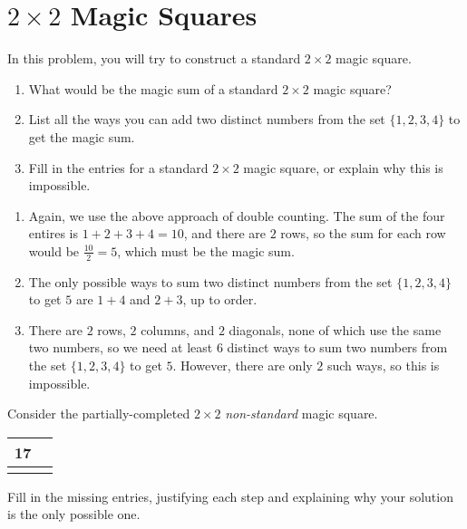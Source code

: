\documentclass[11pt]{article}
\renewenvironment{problem}{\begin{problems}}{\end{problems}\vspace{5pt}}
\begin{document}
\section{$2 \times 2$ Magic Squares}

\begin{problem}[6=2+2+2 points]
In this problem, you will try to construct a standard $2 \times 2$ magic square.
\begin{enumerate}[label=(\alph*)]
\item What would be the magic sum of a standard $2 \times 2$ magic square?

\item List all the ways you can add two distinct numbers from the set $\{1, 2, 3, 4\}$ to get the magic sum.

\item Fill in the entries for a standard $2 \times 2$ magic square, or explain why this is impossible.
\end{enumerate}
\end{problem}

\begin{solution}
\begin{enumerate}[label=(\alph*)]
\item Again, we use the above approach of double counting. The sum of the four entires is $1+2+3+4=10$, and 
there are $2$ rows, so the sum for each row would be $\frac{10}{2} = \boxed{5}$, which must be the magic sum.

\item The only possible ways to sum two distinct numbers from the set $\{1, 2, 3, 4\}$ to get $5$ are
$\boxed{1+4}$ and $\boxed{2+3}$, up to order.

\item There are $2$ rows, $2$ columns, and $2$ diagonals, none of which use the same two numbers, so we
need at least $6$ distinct ways to sum two numbers from the set $\{1, 2, 3, 4\}$ to get $5$. However,
there are only $2$ such ways, so this is impossible.
\end{enumerate}
\end{solution}


\begin{problem}[4 points]
Consider the partially-completed $2 \times 2$ \textit{non-standard} magic square.
\begin{center}
\begin{tabular}{|c|c|}
\hline
17 & \phantom{17} \\ \hline
 & \\ \hline
\end{tabular}
\end{center}
Fill in the missing entries, justifying each step and explaining why your solution is the only possible one.
\end{problem}
\end{document}
